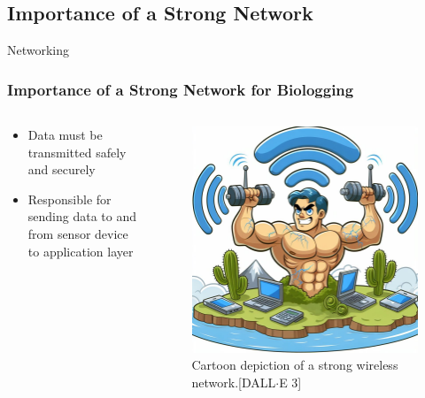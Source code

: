 \documentclass{beamer}
\begin{document}
\subsection{Importance of a Strong Network}
  \begin{frame}{Networking}
    \frametitle{Importance of a Strong Network for Biologging}
    \begin{columns}
      \begin{column}{0.5\textwidth}
        \begin{itemize}
          \item Data must be transmitted safely and securely
          \item Responsible for sending data to and from sensor device to application layer
        \end{itemize}
      \end{column}
      \begin{column}{0.5\textwidth}
        \begin{figure}[htbp]
          \centering
          \includegraphics[width=\textwidth]{StrongNetwork.jpg}
          \caption{Cartoon depiction of a strong wireless network.[DALL$\cdot$E 3]}
          \label{fig:Strong_wireless_network}
        \end{figure}
      \end{column}
    \end{columns}
  \end{frame}
\end{document}
